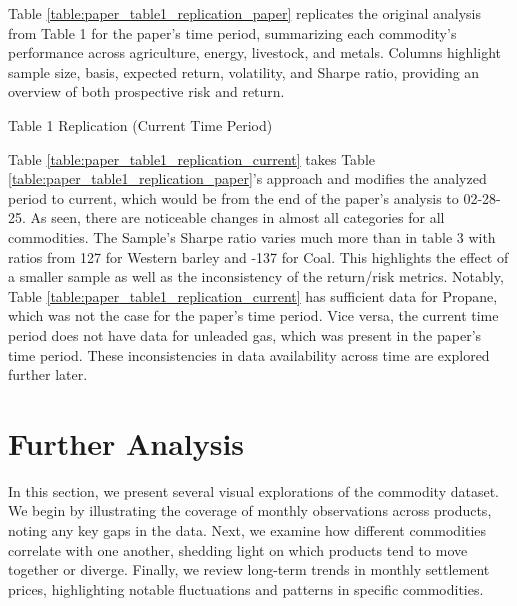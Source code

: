 \documentclass[12pt]{article}
\begin{document}
Table \ref{table:paper_table1_replication_paper} replicates the original analysis from Table 1 for the paper's time period,
      summarizing each commodity’s performance across agriculture, energy, livestock, and metals. 
      Columns highlight sample size, basis, expected return, volatility, and Sharpe ratio, providing 
      an overview of both prospective risk and return.

\newpage

\begin{table}[ht!]
  \caption{Table 1 Replication (Current Time Period)}
  \centering
  \begin{adjustbox}{max width=\textwidth}
  
  \end{adjustbox}
  \label{table:paper_table1_replication_current}
\end{table}


Table \ref{table:paper_table1_replication_current} takes Table \ref{table:paper_table1_replication_paper}'s approach and modifies the analyzed period to current, which would be from the end of the paper's
      analysis to 02-28-25. As seen, there are noticeable changes in almost all categories for all commodities. The Sample's Sharpe ratio
      varies much more than in table 3 with ratios from 127 for Western barley and -137 for Coal. This highlights the effect of a smaller sample
      as well as the inconsistency of the return/risk metrics.
      Notably, Table \ref{table:paper_table1_replication_current} has sufficient data for Propane, which was not the case for the paper's time period.
      Vice versa, the current time period does not have data for unleaded gas, which was present in the paper's time period.
      These inconsistencies in data availability across time are explored further later.


\newpage
\section{Further Analysis}
In this section, we present several visual explorations of the commodity dataset. We begin by illustrating 
the coverage of monthly observations across products, noting any key gaps in the data. Next, we examine 
how different commodities correlate with one another, shedding light on which products tend to move together 
or diverge. Finally, we review long-term trends in monthly settlement prices, highlighting notable fluctuations and 
patterns in specific commodities. 
\end{document}
